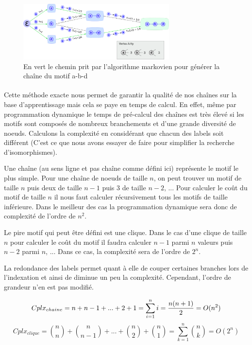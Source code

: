 \documentclass[12pt,french,twoside]{report}
\begin{document}
\begin{figure}
  \includegraphics[width=300px]{Figures/s2m/indexation/markov.png}
  \caption{\label{markov}En vert le chemin prit par l'algorithme markovien pour générer la chaîne du motif a-b-d}
\end{figure}

\paragraph{}Cette méthode exacte nous permet de garantir la qualité de nos chaînes sur la base d'apprentissage mais cela se paye
en temps de calcul. En effet, même par programmation dynamique le temps de pré-calcul des chaînes est très élevé si les motifs sont
composés de nombreux branchements et d'une grande diversité de noeuds. Calculons la complexité en considérant que chacun des
labels soit différent (C'est ce que nous avons essayer de faire pour simplifier la recherche d'isomorphismes).

Une chaîne (au sens ligne et pas chaîne comme défini ici) représente le motif le plus simple. Pour une chaîne de noeuds de taille 
$n$, on peut trouver un motif de taille $n$ puis deux de taille $n-1$ puis 3 de taille $n-2$, ... Pour calculer le coût du motif
de taille $n$ il nous faut calculer récursivement tous les motifs de taille inférieure. Dans le meilleur des cas la programmation
dynamique sera donc de complexité de l'ordre de $n^2$.

Le pire motif qui peut être défini est une clique. Dans le cas d'une clique de taille $n$ pour calculer le coût du motif il faudra
calculer $n-1$ parmi $n$ valeurs puis $n-2$ parmi $n$, ... Dans ce cas, la complexité sera de l'ordre de $2^n$.

La redondance des labels permet quant à elle de couper certaines branches lors de l'indexation et ainsi de diminue un peu
la complexité. Cependant, l'ordre de grandeur n'en est pas modifié.

\begin{equation}
 Cplx_{chaine} = n + n-1 + ... + 2 + 1 = \sum_{i=1}^n i = {{n (n+1)} \over 2} = O(n^2)
\end{equation}
\begin{equation}
 Cplx_{clique} = {n \choose n} + {n \choose n-1} + ... + {n \choose 2} + {n \choose 1} = \sum_{k=1}^n {n \choose k} = O(2^n)
\end{equation}
\end{document}
